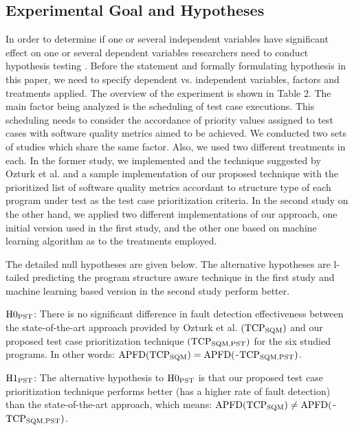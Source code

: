 \documentclass{sig-alternate}
\begin{document}


\subsection{Experimental Goal and Hypotheses}
In order to determine if one or several independent variables have significant effect on one or several dependent variables researchers need to conduct hypothesis testing \cite{wohlin:experimentation}. Before the statement and formally formulating hypothesis in this paper, we need to specify dependent vs. independent variables, factors and treatments applied. The overview of the experiment is shown in Table 2.
The main factor being analyzed is the scheduling of test case executions. This scheduling needs to consider the accordance of priority values assigned to test cases with software quality metrics aimed to be achieved. We conducted two sets of studies which share the same factor. Also, we used two different treatments in each. In the former study, we implemented and the technique suggested by Ozturk et al. \cite{ozturk:quality} and a sample implementation of our proposed technique with the prioritized list of software quality metrics accordant to structure type of each program under test as the test case prioritization criteria. In the second study on the other hand, we applied two different implementations of our approach, one initial version used in the first study, and the other one based on machine learning algorithm as to the treatments employed.

The detailed null hypotheses are
given below. The alternative hypotheses are l-tailed
predicting the program structure aware technique in the first study and machine learning based version in the second study perform better.

$\textnormal{H0} _{\textnormal{PST}}$: There is no significant difference in fault detection effectiveness between the state-of-the-art approach provided by Ozturk et al. $(\textnormal{TCP} _{\textnormal{SQM}})$ and
our proposed test case prioritization technique $(\textnormal{TCP} _{\textnormal{SQM,PST}})$ for the six studied programs. In other words: $\textnormal{APFD}(\textnormal{TCP} _{\textnormal{SQM}}) = \textnormal{APFD}($-$\textnormal{TCP} _{\textnormal{SQM,PST}})$.

$\textnormal{H1} _{\textnormal{PST}}$: The alternative hypothesis to $\textnormal{H0} _{\textnormal{PST}}$ is that our proposed test case prioritization technique performs better (has a higher rate of fault detection)
than the state-of-the-art approach, which means: $\textnormal{APFD}(\textnormal{TCP} _{\textnormal{SQM}}) \neq \textnormal{APFD}($-$\textnormal{TCP} _{\textnormal{SQM,PST}})$. 
\begin{comment}
We can reject the null
hypothesis $H0 _{PST}$ considering all tasks in both Groups A
and B (p-value=0.000036 and 0.00005 respectively).
The effect size is medium (0.51 and 0.55) for both
groups.
\end{comment}
\end{document}

